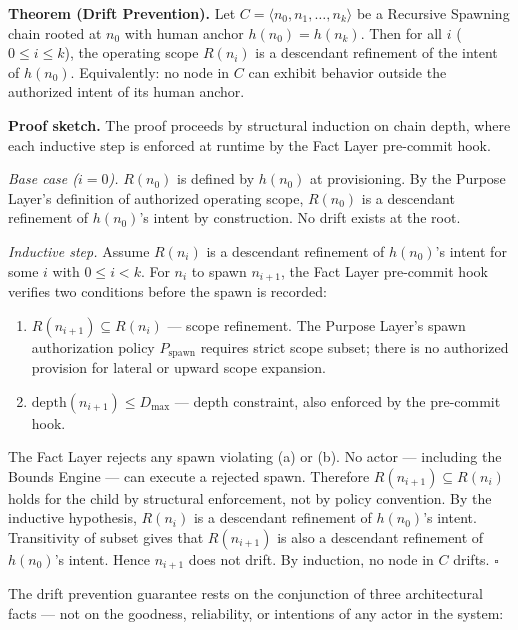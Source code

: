 \medskip
\noindent\textbf{Theorem (Drift Prevention).} Let $C = \langle n_0, n_1, \ldots, n_k \rangle$ be a Recursive Spawning chain rooted at $n_0$ with human anchor $h(n_0) = h(n_k)$. Then for all $i$ ($0 \leq i \leq k$), the operating scope $R(n_i)$ is a descendant refinement of the intent of $h(n_0)$. Equivalently: no node in $C$ can exhibit behavior outside the authorized intent of its human anchor.

\medskip
\noindent\textbf{Proof sketch.} The proof proceeds by structural induction on chain depth, where each inductive step is enforced at runtime by the Fact Layer pre-commit hook.

\medskip
\textit{Base case ($i=0$).} $R(n_0)$ is defined by $h(n_0)$ at provisioning. By the Purpose Layer's definition of authorized operating scope, $R(n_0)$ is a descendant refinement of $h(n_0)$'s intent by construction. No drift exists at the root.

\medskip
\textit{Inductive step.} Assume $R(n_i)$ is a descendant refinement of $h(n_0)$'s intent for some $i$ with $0 \leq i < k$. For $n_i$ to spawn $n_{i+1}$, the Fact Layer pre-commit hook verifies two conditions before the spawn is recorded:

\begin{enumerate}
    \item[(a)] $R(n_{i+1}) \subseteq R(n_i)$ — scope refinement. The Purpose Layer's spawn authorization policy $P_{\mathrm{spawn}}$ requires strict scope subset; there is no authorized provision for lateral or upward scope expansion.
    \item[(b)] $\mathrm{depth}(n_{i+1}) \leq D_{\mathrm{max}}$ — depth constraint, also enforced by the pre-commit hook.
\end{enumerate}

The Fact Layer rejects any spawn violating (a) or (b). No actor — including the Bounds Engine — can execute a rejected spawn. Therefore $R(n_{i+1}) \subseteq R(n_i)$ holds for the child by structural enforcement, not by policy convention. By the inductive hypothesis, $R(n_i)$ is a descendant refinement of $h(n_0)$'s intent. Transitivity of subset gives that $R(n_{i+1})$ is also a descendant refinement of $h(n_0)$'s intent. Hence $n_{i+1}$ does not drift. By induction, no node in $C$ drifts. $\square$

\medskip
The drift prevention guarantee rests on the conjunction of three architectural facts — not on the goodness, reliability, or intentions of any actor in the system:

